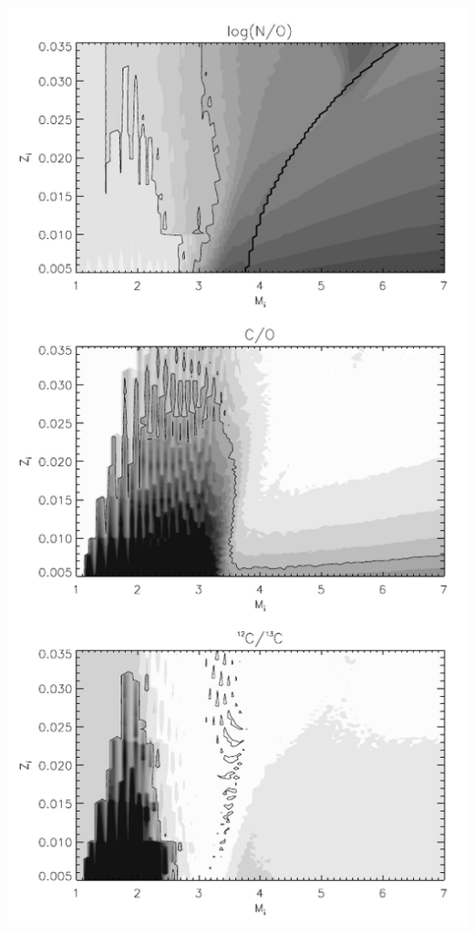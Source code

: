 {\begin{minipage}[t]{0.59\textwidth}
\begin{center}
  \end{center}
\end{minipage}
\hfill
\begin{minipage}[t]{0.39\textwidth}
\vspace{0.1cm}
  \begin{center}
    \includegraphics[width=\textwidth,height=!]{./A/mz.pdf}   
  \end{center}
\end{minipage}
\vfill



}

